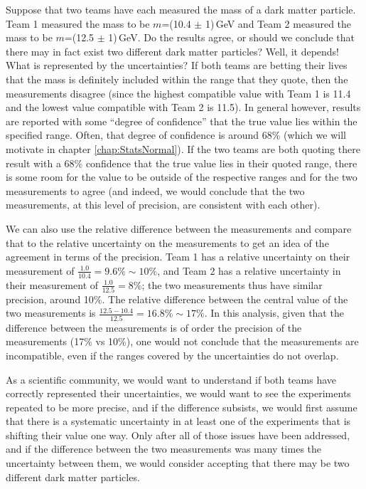 Suppose that two teams have each measured the mass of a dark matter particle. Team 1 measured the mass to be $m$=(10.4 $\pm$ 1)\,GeV and Team 2 measured the mass to be $m$=(12.5 $\pm$ 1)\,GeV. Do the results agree, or should we conclude that there may in fact exist two different dark matter particles? Well, it depends! What is represented by the uncertainties? If both teams are betting their lives that the mass is definitely included within the range that they quote, then the measurements disagree (since the highest compatible value with Team 1 is 11.4 and the lowest value compatible with Team 2 is 11.5). In general however, results are reported with some ``degree of confidence'' that the true value lies within the specified range. Often, that degree of confidence is around 68\% (which we will motivate in chapter \ref{chap:StatsNormal}). If the two teams are both quoting there result with a 68\% confidence that the true value lies in their quoted range, there is some room for the value to be outside of the respective ranges and for the two measurements to agree (and indeed, we would conclude that the two measurements, at this level of precision, are consistent with each other).

We can also use the relative difference between the measurements and compare that to the relative uncertainty on the measurements to get an idea of the agreement in terms of the precision. Team 1 has a relative uncertainty on their measurement of $\frac{1.0}{10.4}=9.6\%\sim 10\%$, and Team 2 has a relative uncertainty in their measurement of $\frac{1.0}{12.5}=8\%$; the two measurements thus have similar precision, around 10\%. The relative difference between the central value of the two measurements is $\frac{12.5-10.4}{12.5} = 16.8\% \sim 17\%$. In this analysis, given that the difference between the measurements is of order the precision of the measurements (17\% vs 10\%), one would not conclude that the measurements are incompatible, even if the ranges covered by the uncertainties do not overlap.

As a scientific community, we would want to understand if both teams have correctly represented their uncertainties, we would want to see the experiments repeated to be more precise, and if the difference subsists, we would first assume that there is a systematic uncertainty in at least one of the experiments that is shifting their value one way. Only after all of those issues have been addressed, and if the difference between the two measurements was many times the uncertainty between them, we would consider accepting that there may be two different dark matter particles.


